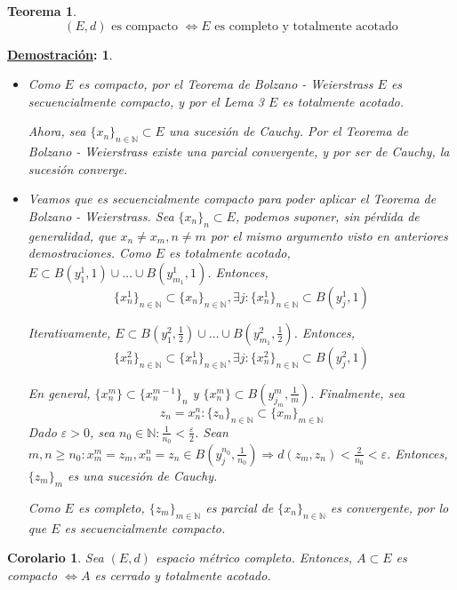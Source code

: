 \documentclass[10pt,a4paper,openright]{book}
\theoremstyle{break}
\newtheorem*{theo}{Teorema}
\newtheorem*{coro}{Corolario}
\newtheorem*{demo}{\underline{Demostración}:}
\begin{document}
\begin{theo}
$$(E,d) \mbox{ es compacto }\Leftrightarrow E \mbox{ es completo y totalmente acotado}$$
\end{theo}

\begin{demo}
\begin{itemize}
\item \fbox{$\Rightarrow$}
Como $E$ es compacto, por el Teorema de Bolzano - Weierstrass $E$ es secuencialmente compacto, y por el Lema 3 $E$ es totalmente acotado.

Ahora, sea $\{x_n\}_{n \in \mathbb{N}} \subset E$ una sucesión de Cauchy. Por el Teorema de Bolzano - Weierstrass existe una parcial convergente, y por ser de Cauchy, la sucesión converge.
 
\item \fbox{$\Leftarrow$}
Veamos que es secuencialmente compacto para poder aplicar el Teorema de Bolzano - Weierstrass. Sea $\{x_n\}_n \subset E$, podemos suponer, sin pérdida de generalidad, que $x_n \neq x_m, n \neq m$ por el mismo argumento visto en anteriores demostraciones. Como $E$ es totalmente acotado, $E \subset B(y_1^1, 1) \cup \ldots \cup B(y_{m_1}^1,1)$. Entonces, 
$$\{x^1_n\}_{n \in \mathbb{N}} \subset \{x_n\}_{n \in \mathbb{N}}, \exists j : \{x_n^1\}_{n \in \mathbb{N}} \subset B(y_j^1, 1)$$

Iterativamente,  $E \subset B(y_1^2, \frac{1}{2}) \cup \ldots \cup B(y_{m_1}^2,\frac{1}{2})$. Entonces, 
$$\{x^2_n\}_{n \in \mathbb{N}} \subset \{x_n^1\}_{n \in \mathbb{N}}, \exists j : \{x_n^2\}_{n \in \mathbb{N}} \subset B(y_j^2, 1)$$

En general, $\{x_n^m\} \subset \{x_n^{m-1}\}_n$ y $\{x_n^m\} \subset B(y_{j_m}^m, \frac{1}{m})$. Finalmente, sea $$z_n = x^n_n : \{z_n\}_{n \in \mathbb{N}} \subset \{x_m\}_{m \in \mathbb{N}}$$
Dado $\varepsilon > 0$, sea $n_0 \in \mathbb{N} : \frac{1}{n_0} < \frac{\varepsilon}{2}$. Sean $m,n \geq n_0 : x_m^m = z_m ,  x^n_n = z_n \in B(y_j^{n_0}, \frac{1}{n_0}) \Rightarrow d(z_m, z_n) < \frac{2}{n_0} < \varepsilon$. Entonces, $\{z_m\}_m$ es una sucesión de Cauchy. 

Como $E$ es completo, $\{z_m\}_{m \in \mathbb{N}}$ es parcial de $\{x_n\}_{n \in \mathbb{N}}$ es convergente, por lo que $E$ es secuencialmente compacto. 
\end{itemize}
\end{demo}

\begin{coro}
Sea $(E,d)$ espacio métrico completo. Entonces, $A \subset E$ es compacto $\Leftrightarrow A$ es cerrado y totalmente acotado.
\end{coro}
\end{document}
